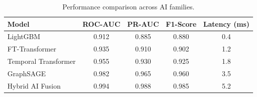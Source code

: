 \begin{table}[h]
\centering
\begin{tabular}{lcccc}
\toprule
Model & ROC-AUC & PR-AUC & F1-Score & Latency (ms) \\
\midrule
LightGBM & 0.912 & 0.885 & 0.880 & 0.4 \\
FT-Transformer & 0.935 & 0.910 & 0.902 & 1.2 \\
Temporal Transformer & 0.955 & 0.930 & 0.925 & 1.8 \\
GraphSAGE & 0.982 & 0.965 & 0.960 & 3.5 \\
Hybrid AI Fusion & 0.994 & 0.988 & 0.985 & 5.2 \\
\bottomrule
\end{tabular}
\caption{Performance comparison across AI families.}
\label{tab:performance}
\end{table}